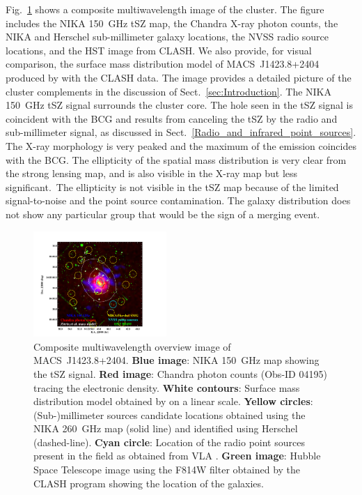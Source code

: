 \documentclass[traditabstract]{aa}
\begin{document}
Fig.~\ref{fig:MACSJ1424_mutiw} shows a composite multiwavelength image of the cluster. The figure includes the NIKA 150~GHz tSZ map, the Chandra X-ray photon counts, the NIKA and Herschel sub-millimeter galaxy locations, the NVSS radio source locations, and the HST image from CLASH. We also provide, for visual comparison, the surface mass distribution model of \mbox{MACS~J1423.8+2404} produced by \cite{zitrin2011,zitrin2015} with the CLASH data. The image provides a detailed picture of the cluster complements in the discussion of Sect.~\ref{sec:Introduction}. The NIKA 150~GHz  tSZ signal surrounds the cluster core. The hole seen in the tSZ signal is coincident with the BCG and results from  canceling  the tSZ by the radio and sub-millimeter signal, as discussed in Sect.~\ref{Radio_and_infrared_point_sources}. The X-ray morphology is very peaked and the maximum of the emission coincides with the BCG. The ellipticity of the spatial mass distribution is very clear from the strong lensing map, and is also visible in the X-ray map but less significant.\ The ellipticity is not visible in the tSZ map because of the limited signal-to-noise and the point source contamination. The galaxy distribution does not show any particular group that would be the sign of a merging event.
\begin{figure}[]
\centering
\includegraphics[trim=1cm 0cm 5cm 2cm, clip=true, width=0.45\textwidth]{Figure/MACSJ1424_multicolor.pdf}
\caption{\footnotesize Composite multiwavelength overview image of \mbox{MACS~J1423.8+2404}. {\bf Blue image}: NIKA 150~GHz map showing the tSZ signal. {\bf Red image}: Chandra photon counts (Obs-ID 04195) tracing the electronic density. {\bf White contours}: Surface mass distribution model obtained by \cite{zitrin2011,zitrin2015} on a linear scale. {\bf Yellow circles}: (Sub-)millimeter sources candidate locations obtained using the NIKA 260~GHz map (solid line) and identified using Herschel (dashed-line). {\bf Cyan circle}: Location of the radio point sources present in the field as obtained from VLA \citep{laroque2003}. {\bf Green image}: Hubble Space Telescope image using the F814W filter obtained by the CLASH  program \citep{postman2012} showing the location of the galaxies.}
\label{fig:MACSJ1424_mutiw}
\end{figure}
\end{document}
